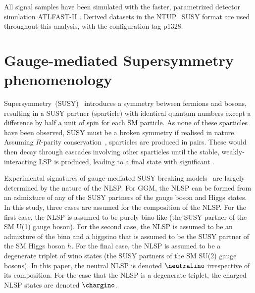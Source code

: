 All signal samples have been simulated with the faster, parametrized detector simulation ATLFAST-II \cite{Richter-Was:683751}. Derived datasets in the {\sc NTUP\_SUSY}
format are used throughout this analysis, with the configuration tag p1328.









\section{Gauge-mediated Supersymmetry phenomenology}
\label{sec:susy}
Supersymmetry~(SUSY)~\cite{Miyazawa:1966,Ramond:1971gb,Golfand:1971iw,Neveu:1971rx,Neveu:1971iv,Gervais:1971ji,Volkov:1973ix,Wess:1973kz,Wess:1974tw}
introduces a symmetry between fermions and bosons, resulting in a SUSY
partner (sparticle) with identical quantum numbers except a difference
by half a unit of spin for each SM particle. As none
of these sparticles have been observed, SUSY must be a broken symmetry
if realised in nature.  Assuming $R$-parity
conservation~\cite{Fayet:1976et,Fayet:1977yc,Farrar:1978xj,Fayet:1979sa,Dimopoulos:1981zb},
sparticles are
produced in pairs.  These would then decay through cascades involving
other sparticles until the stable, weakly-interacting LSP is produced, leading
to a final state with significant \MET.

Experimental signatures of gauge-mediated SUSY breaking
models~\cite{Dine:1981gu,AlvarezGaume:1981wy,Nappi:1982hm,Dine:1993yw, Dine:1994vc,Dine:1995ag}
are largely determined by the nature of the NLSP.
For GGM,
the NLSP can be formed from an admixture of any of the SUSY partners
of the gauge boson and Higgs states.
In this study, three cases are assumed for the
composition of the NLSP. For the first case, the NLSP is assumed to be
purely bino-like (the SUSY partner of the SM U(1) gauge boson). For the
second case, the NLSP is assumed to be an admixture
of the bino and a higgsino that is assumed to be the SUSY partner
of the SM Higgs boson $h$. For the final
case, the NLSP is assumed to be a degenerate triplet
of wino states (the SUSY partners of the SM SU(2) gauge bosons).
In this paper, the neutral NLSP is denoted $\neutralino$ irrespective
of its composition. For the case that
the NLSP is a degenerate triplet, the charged NLSP states are denoted $\chargino$.

